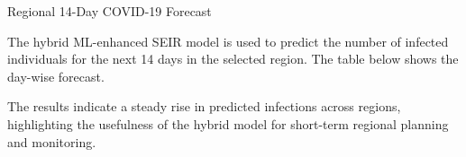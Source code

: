 \documentclass{beamer}
\begin{document}
\begin{frame}{Regional 14-Day COVID-19 Forecast}

The hybrid ML-enhanced SEIR model is used to predict the number of infected individuals
for the next 14 days in the selected region. The table below shows the day-wise forecast.

\begin{table}
\centering
\scriptsize
{}
\caption{Fourteen-day infection forecast generated using the Hybrid SEIR model}
\end{table}

\vspace{0.2cm}
\small
The results indicate a steady rise in predicted infections across regions,
highlighting the usefulness of the hybrid model for short-term regional planning and monitoring.

\end{frame}

\end{document}
